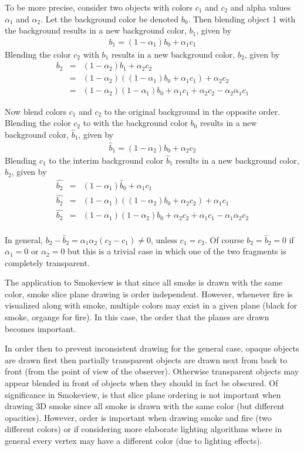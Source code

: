 \documentclass[11pt,twoside]{book}
\begin{document}
To be more precise, consider two objects with colors $c_1$ and $c_2$ and alpha values $\alpha_1$ and $\alpha_2$.   Let the background color be denoted $b_0$.  Then blending object 1 with the background results in a new background color, $b_1$, given by
\begin{eqnarray*}
b_1=(1-\alpha_1)b_0 + \alpha_1c_1
\end{eqnarray*}
Blending the color $c_2$ with $b_1$ results in a new background color, $b_2$, given by
\begin{eqnarray*}
b_2&=&(1-\alpha_2)b_1 + \alpha_2c_2\\
&=&(1-\alpha_2)((1-\alpha_1)b_0 + \alpha_1c_1)+\alpha_2c_2\\
&=&(1-\alpha_2)(1-\alpha_1)b_0 + \alpha_1c_1 + \alpha_2c_2 - \alpha_2\alpha_1c_1
\end{eqnarray*}

Now blend colors $c_1$ and $c_2$ to the original background in the opposite order.
Blending the color $c_2$ to with the background color $b_0$ results in a new background color, $\hat{b}_1$, given by
\begin{eqnarray*}
\hat{b}_1=(1-\alpha_2)b_0 + \alpha_2c_2
\end{eqnarray*}
Blending $c_1$ to the interim background color $\hat{b}_1$ results in a new background color, $\hat{b}_2$, given by
\begin{eqnarray*}
\hat{b_2}&=&(1-\alpha_1)\hat{b}_0+\alpha_1c_1\\
\hat{b_2}&=&(1-\alpha_1)((1-\alpha_2)b_0 + \alpha_2c_2)+\alpha_1c_1\\
\hat{b_2}&=&(1-\alpha_1)(1-\alpha_2)b_0 + \alpha_2c_2 + \alpha_1c_1 - \alpha_1\alpha_2c_2\\
\end{eqnarray*}


In general, $b_2-\hat{b}_2=\alpha_1\alpha_2(c_2-c_1)\ne 0$, unless $c_1=c_2$.  Of course $b_2=\hat{b}_2=0$ if $\alpha_1=0$ or $\alpha_2=0$ but this is a trivial case in which one of the two fragments is completely transparent.  

The application to Smokeview is that since all smoke is drawn with the same color, smoke slice plane drawing is order independent.  However, whenever fire is visualized along with smoke, multiple colors may exist in a given plane (black for smoke, organge for fire).  In this case, the order that the planes are drawn becomes important.

In order then to prevent inconsistent drawing for the general case, opaque
objects are drawn first then partially transparent objects
are drawn next from back to front (from the point of view of
the observer). Otherwise transparent objects may appear blended in
front of objects when they should in fact be obscured.
Of significance in Smokeview, is that slice plane ordering is not important when drawing 3D smoke since all smoke is drawn with the same color (but different opacities).  However, order is important when drawing smoke and fire (two different colors) or if considering more elaborate lighting algorithms where in general every vertex may have a different color (due to lighting effects).
\end{document}
